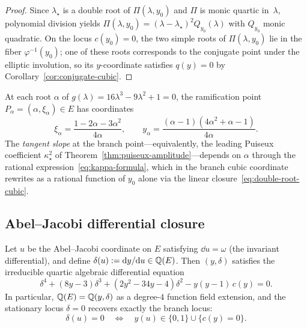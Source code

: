 \begin{proof}
Since $\lambda_\star$ is a double root of $\Pi(\lambda,y_0)$ and $\Pi$ is monic quartic in~$\lambda$, polynomial division yields $\Pi(\lambda,y_0)=(\lambda-\lambda_\star)^2 Q_{y_0}(\lambda)$ with $Q_{y_0}$ monic quadratic.
On the locus $c(y_0)=0$, the two simple roots of $\Pi(\lambda,y_0)$ lie in the fiber $\varphi^{-1}(y_0)$; one of these roots corresponds to the conjugate point under the elliptic involution, so its $y$-coordinate satisfies $q(y)=0$ by Corollary~\ref{cor:conjugate-cubic}.
\end{proof}

\begin{remark}\label{rmk:branch-point-coords}
At each root $\alpha$ of $g(\lambda)=16\lambda^3-9\lambda^2+1=0$, the ramification point $P_\alpha=(\alpha,\xi_\alpha)\in E$ has coordinates
\[
\xi_\alpha=\frac{1-2\alpha-3\alpha^2}{4\alpha},\qquad y_\alpha=\frac{(\alpha-1)(4\alpha^2+\alpha-1)}{4\alpha}.
\]
The \emph{tangent slope} at the branch point---equivalently, the leading Puiseux coefficient $\kappa_\star^2$ of Theorem~\ref{thm:puiseux-amplitude}---depends on $\alpha$ through the rational expression~\eqref{eq:kappa-formula}, which in the branch cubic coordinate rewrites as a rational function of $y_0$ alone via the linear closure~\eqref{eq:double-root-cubic}.
\end{remark}

\subsection{Abel--Jacobi differential closure}

\begin{proposition}\label{prop:abel-jacobi-ode}
Let $u$ be the Abel--Jacobi coordinate on $E$ satisfying $\dd u=\omega$ (the invariant differential), and define $\delta(u):=\mathrm{d} y/\mathrm{d} u\in\mathbb{Q}(E)$.
Then $(y,\delta)$ satisfies the irreducible quartic algebraic differential equation
\begin{equation}\label{eq:abel-jacobi-ode}
\delta^4+(8y-3)\delta^3+(2y^2-34y-4)\delta^2-y(y-1)\,c(y)=0.
\end{equation}
In particular, $\mathbb{Q}(E)=\mathbb{Q}(y,\delta)$ as a degree-$4$ function field extension, and the stationary locus $\delta=0$ recovers exactly the branch locus:
\[
\delta(u)=0\quad\Longleftrightarrow\quad y(u)\in\{0,1\}\cup\{c(y)=0\}.
\]
\end{proposition}

